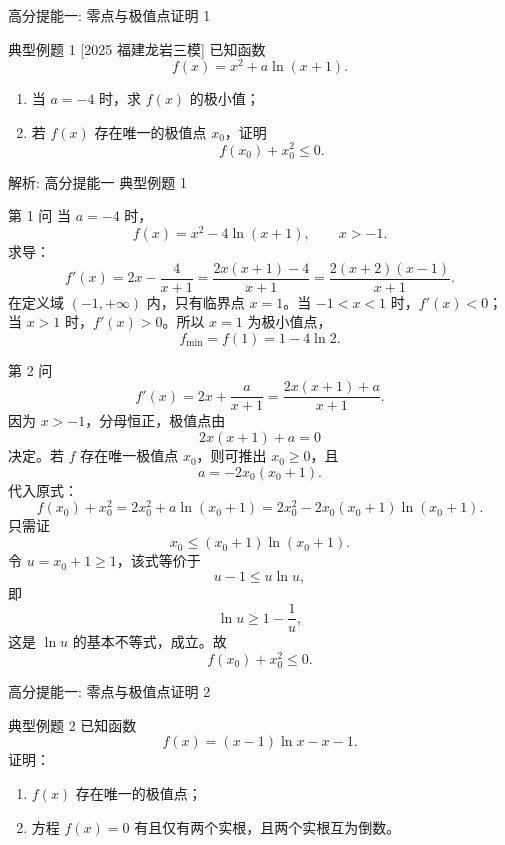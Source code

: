﻿\documentclass[aspectratio=169,10pt]{ctexbeamer}
\begin{document}
\begin{frame}[t]{高分提能一: 零点与极值点证明 1}
\large
\begin{block}{典型例题 1}
[2025 福建龙岩三模] 已知函数
\[
f(x)=x^2+a\ln(x+1).
\]
\begin{enumerate}
  \item 当 $a=-4$ 时，求 $f(x)$ 的极小值；
  \item 若 $f(x)$ 存在唯一的极值点 $x_0$，证明
  \[
  f(x_0)+x_0^2\le 0.
  \]
\end{enumerate}
\end{block}
\end{frame}

\begin{frame}[t,allowframebreaks]{解析: 高分提能一 典型例题 1}
\tiny
\begin{block}{第 1 问}
当 $a=-4$ 时，
\[
f(x)=x^2-4\ln(x+1),\qquad x>-1.
\]
求导：
\[
f'(x)=2x-\frac4{x+1}
=\frac{2x(x+1)-4}{x+1}
=\frac{2(x+2)(x-1)}{x+1}.
\]
在定义域 $(-1,+\infty)$ 内，只有临界点 $x=1$。当 $-1<x<1$ 时，$f'(x)<0$；
当 $x>1$ 时，$f'(x)>0$。所以 $x=1$ 为极小值点，
\[
f_{\min}=f(1)=1-4\ln2.
\]
\end{block}
\begin{block}{第 2 问}
\[
f'(x)=2x+\frac a{x+1}
=\frac{2x(x+1)+a}{x+1}.
\]
因为 $x>-1$，分母恒正，极值点由
\[
2x(x+1)+a=0
\]
决定。若 $f$ 存在唯一极值点 $x_0$，则可推出 $x_0\ge0$，且
\[
a=-2x_0(x_0+1).
\]
代入原式：
\[
f(x_0)+x_0^2
=2x_0^2+a\ln(x_0+1)
=2x_0^2-2x_0(x_0+1)\ln(x_0+1).
\]
只需证
\[
x_0\le (x_0+1)\ln(x_0+1).
\]
令 $u=x_0+1\ge1$，该式等价于
\[
u-1\le u\ln u,
\]
即
\[
\ln u\ge1-\frac1u,
\]
这是 $\ln u$ 的基本不等式，成立。故
\[
f(x_0)+x_0^2\le0.
\]
\end{block}
\end{frame}

\begin{frame}[t]{高分提能一: 零点与极值点证明 2}
\large
\begin{block}{典型例题 2}
已知函数
\[
f(x)=(x-1)\ln x-x-1.
\]
证明：
\begin{enumerate}
  \item $f(x)$ 存在唯一的极值点；
  \item 方程 $f(x)=0$ 有且仅有两个实根，且两个实根互为倒数。
\end{enumerate}
\end{block}
\end{frame}
\end{document}

